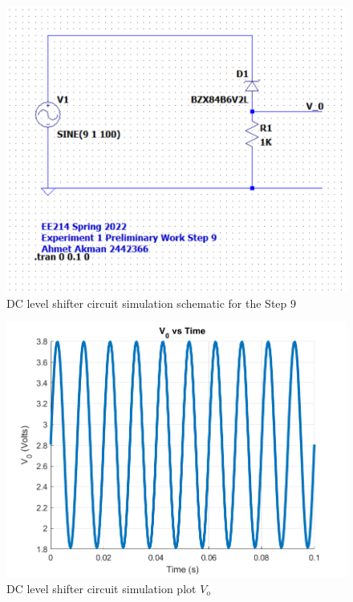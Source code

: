 \documentclass[letterpaper,12pt]{article}
\begin{document}
\begin{figure}[H]
    \centering
   \includegraphics[width=1\textwidth]{9SCH.png}
   \caption{DC level shifter circuit simulation schematic for the Step 9}
\end{figure} 

\begin{figure}[H]
    \centering
   \includegraphics[width=1\textwidth]{9.png}
   \caption{DC level shifter circuit simulation  plot \(V_o\)}
\end{figure} 
\end{document}
